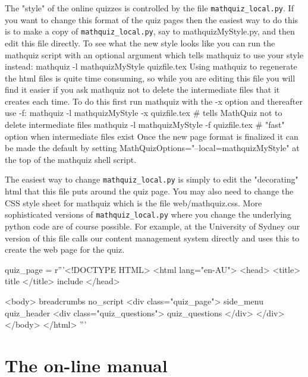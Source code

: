 \documentclass[svgnames]{article}
\begin{document}
  The "style" of the online quizzes is controlled by the file
  \verb!mathquiz_local.py!. If you want to change this format of the quiz
  pages then the easiest way to do this is to make a copy of
  \verb!mathquiz_local.py!, say to mathquizMyStyle.py, and then edit this file
  directly. To see what the new style looks like you can run the
  mathquiz script with an optional argument which tells mathquiz to use
  your style instead: mathquiz -l mathquizMyStyle quizfile.tex Using
  mathquiz to regenerate the html files is quite time consuming, so
  while you are editing this file you will find it easier if you ask
  mathquiz not to delete the intermediate files that it creates each
  time. To do this first run mathquiz with the -x option and thereafter
  use -f: mathquiz -l mathquizMyStyle -x quizfile.tex   \# tells
  MathQuiz not to delete intermediate files mathquiz -l mathquizMyStyle
  -f quizfile.tex   \# "fast" option when intermediate files exist Once
  the new page format is finalized it can be made the default by setting
  MathQuizOptions="--local=mathquizMyStyle" at the top of the mathquiz
  shell script.

  The easiest way to change \verb!mathquiz_local.py! is simply to edit the
  "decorating" html that this file puts around the quiz page. You may
  also need to change the CSS style sheet for mathquiz which is the file
  web/mathquiz.css. More sophisticated versions of \verb!mathquiz_local.py!
  where you change the underlying python code are of course possible.
  For example, at the University of Sydney our version of this file
  calls our content management system directly and uses this to create
  the web page for the quiz.

\begin{pythoncode}
    quiz_page = r'''<!DOCTYPE HTML>
    <html lang="en-AU">
    <head>
      <title> {title} </title>
      {include}
    </head>

    <body>
      {breadcrumbs}
      {no_script}
      <div class="quiz_page">
        {side_menu}
        {quiz_header}
        <div class="quiz_questions">
          {quiz_questions}
        </div>
      </div>
    </body>
    </html>
    '''
\end{pythoncode}




  \section{The on-line manual}

    
\end{document}
